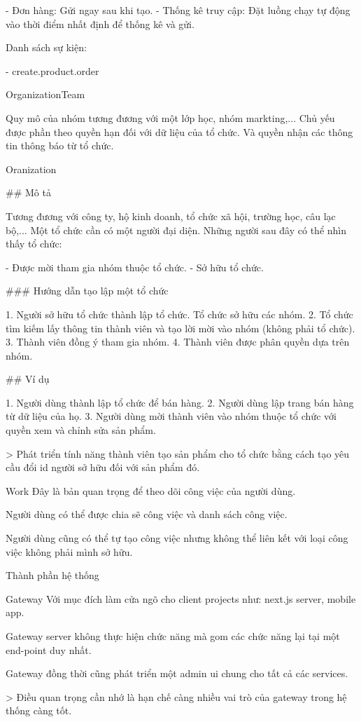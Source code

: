 -   Đơn hàng: Gửi ngay sau khi tạo.
-   Thống kê truy cập: Đặt luồng chạy tự động vào thời điểm nhất định để thống kê và gửi.

Danh sách sự kiện:

-   create.product.order

OrganizationTeam

Quy mô của nhóm tương đương với một lớp học, nhóm markting,...
Chủ yếu được phần theo quyền hạn đối với dữ liệu của tổ chức.
Và quyền nhận các thông tin thông báo từ tổ chức.

Oranization

\#\# Mô tả

Tương đương với công ty, hộ kinh doanh, tổ chức xã hội, trường học, câu lạc bộ,...
Một tổ chức cần có một người đại diện.
Những người sau đây có thể nhìn thấy tổ chức:

- Được mời tham gia nhóm thuộc tổ chức.
- Sở hữu tổ chức.

\#\#\# Hướng dẫn tạo lập một tổ chức

1. Người sở hữu tổ chức thành lập tổ chức. Tổ chức sở hữu các nhóm.
2. Tổ chức tìm kiếm lấy thông tin thành viên và tạo lời mời vào nhóm (không phải tổ chức).
3. Thành viên đồng ý tham gia nhóm.
4. Thành viên được phân quyền dựa trên nhóm.

\#\# Ví dụ

1. Người dùng thành lập tổ chức để bán hàng.
2. Người dùng lập trang bán hàng từ dữ liệu của họ.
3. Người dùng mời thành viên vào nhóm thuộc tổ chức với quyền xem và chỉnh sửa sản phẩm.

> Phát triển tính năng thành viên tạo sản phẩm cho tổ chức bằng cách tạo yêu cầu đổi id người sở hữu đối với sản phẩm đó.


Work
Đây là bản quan trọng để theo dõi công việc của người dùng.

Người dùng có thể được chia sẽ công việc và danh sách công việc.

Người dùng cũng có thể tự tạo công việc nhưng không thể liên kết với loại công việc không phải mình sở hữu.

Thành phần hệ thống


Gateway 
Với mục đích làm cửa ngõ cho client projects như: next.js server, mobile app.

Gateway server không thực hiện chức năng mà gom các chức năng lại tại một end-point duy nhất.

Gateway đồng thời cũng phát triển một admin ui chung cho tất cả các services.

> Điều quan trọng cần nhớ là hạn chế càng nhiều vai trò của gateway trong hệ thống càng tốt.

\blindtext
